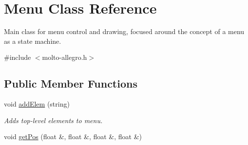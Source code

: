 \hypertarget{classMenu}{\section{Menu Class Reference}
\label{classMenu}
}


Main class for menu control and drawing, focused around the concept of a menu as a state machine.  




{\ttfamily \#include $<$molto-\/allegro.\-h$>$}

\subsection*{Public Member Functions}
\begin{DoxyCompactItemize}
\item 
void \hyperlink{classMenu_a972a89c0d3601b0dc1894b9ead61a040}{add\-Elem} (string)
\begin{DoxyCompactList}\small\item\em Adds top-\/level elements to menu. \end{DoxyCompactList}\item 
\hypertarget{classMenu_af73bc84bf1d4aad04741acccfb02d4c2}{void \hyperlink{classMenu_af73bc84bf1d4aad04741acccfb02d4c2}{get\-Pos} (float \&, float \&, float \&, float \&)}\label{classMenu_af73bc84bf1d4aad04741acccfb02d4c2}


\end{DoxyCompactItemize}
